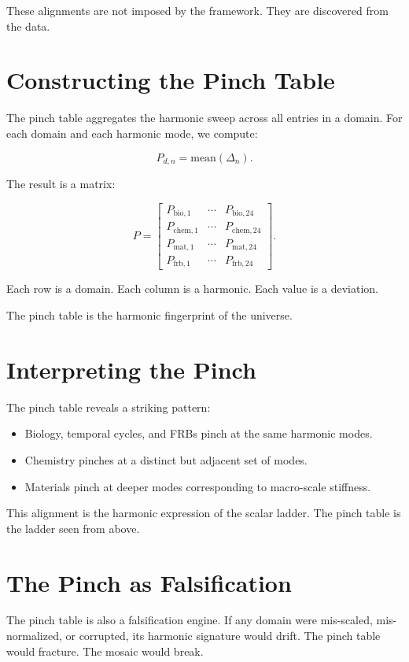 \documentclass[11pt, letterpaper, openany]{book}
\begin{document}
These alignments are not imposed by the framework.  
They are discovered from the data.

\section*{Constructing the Pinch Table}
The pinch table aggregates the harmonic sweep across all entries in a domain. For each domain and
each harmonic mode, we compute:



\[
P_{d,n} = \mathrm{mean}(\Delta_n).
\]



The result is a matrix:



\[
P =
\begin{bmatrix}
P_{\mathrm{bio},1} & \cdots & P_{\mathrm{bio},24} \\
P_{\mathrm{chem},1} & \cdots & P_{\mathrm{chem},24} \\
P_{\mathrm{mat},1} & \cdots & P_{\mathrm{mat},24} \\
P_{\mathrm{frb},1} & \cdots & P_{\mathrm{frb},24}
\end{bmatrix}.
\]



Each row is a domain.  
Each column is a harmonic.  
Each value is a deviation.

The pinch table is the harmonic fingerprint of the universe.

\section*{Interpreting the Pinch}
The pinch table reveals a striking pattern:

\begin{itemize}
    \item Biology, temporal cycles, and FRBs pinch at the same harmonic modes.
    \item Chemistry pinches at a distinct but adjacent set of modes.
    \item Materials pinch at deeper modes corresponding to macro-scale stiffness.
\end{itemize}

This alignment is the harmonic expression of the scalar ladder.  
The pinch table is the ladder seen from above.

\section*{The Pinch as Falsification}
The pinch table is also a falsification engine. If any domain were mis-scaled, mis-normalized, or
corrupted, its harmonic signature would drift. The pinch table would fracture. The mosaic would
break.
\end{document}
